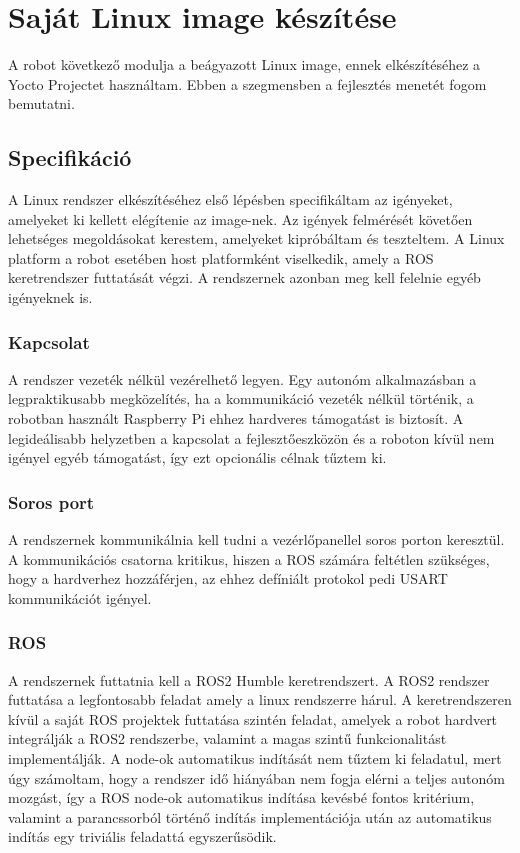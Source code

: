\section{Saját Linux image készítése}

A robot következő modulja a beágyazott Linux image, ennek elkészítéséhez a Yocto
Projectet használtam. Ebben a szegmensben a fejlesztés menetét fogom bemutatni.

\subsection{Specifikáció}

A Linux rendszer elkészítéséhez első lépésben specifikáltam az igényeket,
amelyeket ki kellett elégítenie az image-nek. Az igények felmérését követően
lehetséges megoldásokat kerestem, amelyeket kipróbáltam és teszteltem. A Linux
platform a robot esetében host platformként viselkedik, amely a ROS keretrendszer
futtatását végzi. A rendszernek azonban meg kell felelnie egyéb igényeknek is.

\subsubsection{Kapcsolat}

A rendszer vezeték nélkül vezérelhető legyen. Egy autonóm alkalmazásban a
legpraktikusabb megközelítés, ha a kommunikáció vezeték nélkül történik, a
robotban használt Raspberry Pi ehhez hardveres támogatást is biztosít. A
legideálisabb helyzetben a kapcsolat a fejlesztőeszközön és a roboton kívül nem
igényel egyéb támogatást, így ezt opcionális célnak tűztem ki.

\subsubsection{Soros port}

A rendszernek kommunikálnia kell tudni a vezérlőpanellel soros porton keresztül.
A kommunikációs csatorna kritikus, hiszen a ROS számára feltétlen szükséges, hogy
a hardverhez hozzáférjen, az ehhez defíniált protokol pedi USART kommunikációt
igényel.

\subsubsection{ROS}

A rendszernek futtatnia kell a ROS2 Humble keretrendszert. A ROS2 rendszer
futtatása a legfontosabb feladat amely a linux rendszerre hárul. A
keretrendszeren kívül a saját ROS projektek futtatása szintén feladat, amelyek a
robot hardvert integrálják a ROS2 rendszerbe, valamint a magas szintű
funkcionalitást implementálják. A node-ok automatikus indítását nem tűztem ki
feladatul, mert úgy számoltam, hogy a rendszer idő hiányában nem fogja elérni a
teljes autonóm mozgást, így a ROS node-ok automatikus indítása kevésbé fontos
kritérium, valamint a parancssorból történő indítás implementációja után az
automatikus indítás egy triviális feladattá egyszerűsödik.

